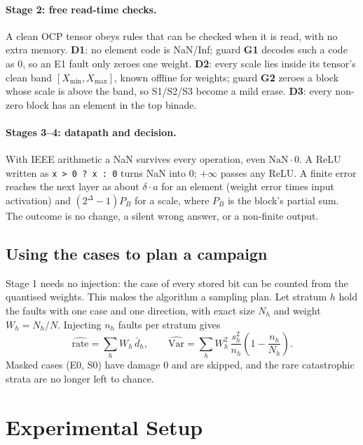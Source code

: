 \documentclass[12pt,a4paper]{article}
\begin{document}
\paragraph{Stage 2: free read-time checks.} A clean OCP tensor obeys rules that can be checked
when it is read, with no extra memory. \textbf{D1}: no element code is NaN/Inf; guard
\textbf{G1} decodes such a code as 0, so an E1 fault only zeroes one weight. \textbf{D2}: every
scale lies inside its tensor's clean band $[X_{\min},X_{\max}]$, known offline for weights;
guard \textbf{G2} zeroes a block whose scale is above the band, so S1/S2/S3 become a mild
erase. \textbf{D3}: every non-zero block has an element in the top binade.

\paragraph{Stages 3--4: datapath and decision.} With IEEE arithmetic a NaN survives every
operation, even $\mathrm{NaN}\cdot0$. A ReLU written as \texttt{x > 0 ? x : 0} turns NaN into
0; $+\infty$ passes any ReLU. A finite error reaches the next layer as about $\delta\cdot a$
for an element (weight error times input activation) and $(2^{\Delta}-1)P_B$ for a scale,
where $P_B$ is the block's partial sum. The outcome is no change, a silent wrong answer, or a
non-finite output.

\subsection{Using the cases to plan a campaign}
\label{sec:stratified}

Stage 1 needs no injection: the case of every stored bit can be counted from the quantised
weights. This makes the algorithm a sampling plan. Let stratum $h$ hold the faults with one
case and one direction, with exact size $N_h$ and weight $W_h=N_h/N$. Injecting $n_h$ faults
per stratum gives
\begin{equation}
    \widehat{\text{rate}} = \sum_h W_h\, \bar d_h, \qquad
    \widehat{\mathrm{Var}} = \sum_h W_h^2\, \frac{s_h^2}{n_h}\left(1 - \frac{n_h}{N_h}\right).
\end{equation}
Masked cases (E0, S0) have damage 0 and are skipped, and the rare catastrophic strata are no
longer left to chance.

\section{Experimental Setup}
\end{document}
